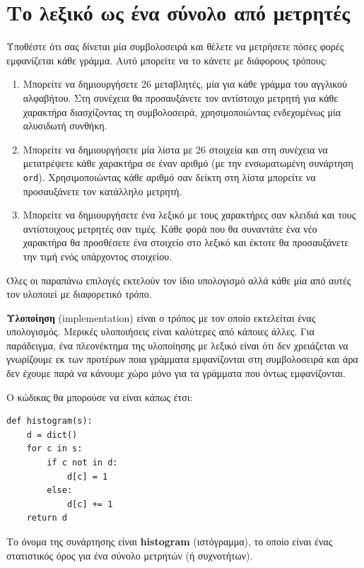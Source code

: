 \documentclass[10pt]{book}
\begin{document}
\section{Το λεξικό ως ένα σύνολο από μετρητές}
\label{histogram}

Υποθέστε ότι σας δίνεται μία συμβολοσειρά και θέλετε να μετρήσετε πόσες φορές εμφανίζεται κάθε γράμμα. Αυτό μπορείτε να το κάνετε με διάφορους τρόπους:

\begin{enumerate}

\item  Μπορείτε να δημιουργήσετε 26 μεταβλητές, μία για κάθε γράμμα του αγγλικού αλφαβήτου. Στη συνέχεια θα προσαυξάνετε τον αντίστοιχο μετρητή για κάθε χαρακτήρα διασχίζοντας τη συμβολοσειρά, χρησιμοποιώντας ενδεχομένως μία αλυσιδωτή συνθήκη.  

\item  Μπορείτε να δημιουργήσετε μία λίστα με 26 στοιχεία και στη συνέχεια να μετατρέψετε κάθε χαρακτήρα σε έναν αριθμό (με την ενσωματωμένη συνάρτηση {\tt ord}). Χρησιμοποιώντας κάθε αριθμό σαν δείκτη στη λίστα μπορείτε να προσαυξάνετε τον κατάλληλο μετρητή. 

\item  Μπορείτε να δημιουργήσετε ένα λεξικό με τους χαρακτήρες σαν κλειδιά και τους αντίστοιχους μετρητές σαν τιμές. Κάθε φορά που θα συναντάτε ένα νέο χαρακτήρα θα προσθέσετε ένα στοιχείο στο λεξικό και έκτοτε θα προσαυξάνετε την τιμή ενός υπάρχοντος στοιχείου. 

\end{enumerate}

Όλες οι παραπάνω επιλογές εκτελούν τον ίδιο υπολογισμό αλλά κάθε μία από αυτές τον υλοποιεί με διαφορετικό τρόπο.

{\bf Υλοποίηση} (implementation) είναι ο τρόπος με τον οποίο εκτελείται ένας υπολογισμός. Μερικές υλοποιήσεις είναι καλύτερες από κάποιες άλλες. Για παράδειγμα, ένα πλεονέκτημα της υλοποίησης με λεξικό είναι ότι δεν χρειάζεται να γνωρίζουμε εκ των προτέρων ποια γράμματα εμφανίζονται στη συμβολοσειρά και άρα δεν έχουμε παρά να κάνουμε χώρο μόνο για τα γράμματα που όντως εμφανίζονται. 

Ο κώδικας θα μπορούσε να είναι κάπως έτσι:

\begin{verbatim}
def histogram(s):
    d = dict()
    for c in s:
        if c not in d:
            d[c] = 1
        else:
            d[c] += 1
    return d
\end{verbatim}
%
Το όνομα της συνάρτησης είναι {\bf histogram} (ιστόγραμμα), το οποίο είναι ένας στατιστικός όρος για ένα σύνολο μετρητών (ή συχνοτήτων).
\end{document}
